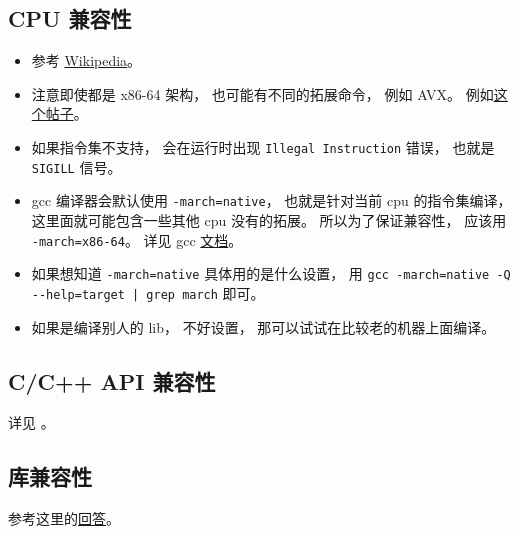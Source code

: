 
\begin{issues}
\issueDraft
\end{issues}


\subsection{CPU 兼容性}

\begin{itemize}
\item 参考 \href{https://en.wikipedia.org/wiki/Binary-code_compatibility}{Wikipedia}。
\item 注意即使都是 x86-64 架构， 也可能有不同的拓展命令， 例如 AVX。 例如\href{https://stackoverflow.com/questions/50945287/illegal-instruction-when-run-precompiled-program-on-other-machine}{这个帖子}。
\item 如果指令集不支持， 会在运行时出现 \verb`Illegal Instruction` 错误， 也就是 \verb`SIGILL` 信号。
\item gcc 编译器会默认使用 \verb`-march=native`， 也就是针对当前 cpu 的指令集编译， 这里面就可能包含一些其他 cpu 没有的拓展。 所以为了保证兼容性， 应该用 \verb`-march=x86-64`。 详见 gcc \href{https://gcc.gnu.org/onlinedocs/gcc/x86-Options.html}{文档}。
\item 如果想知道 \verb`-march=native` 具体用的是什么设置， 用 \verb`gcc -march=native -Q --help=target | grep march` 即可。
\item 如果是编译别人的 lib， 不好设置， 那可以试试在比较老的机器上面编译。
\end{itemize}

\subsection{C/C++ API 兼容性}
详见 。

\subsection{库兼容性}
参考这里的\href{https://stackoverflow.com/questions/20183883/determining-binary-compatibility-under-linux}{回答}。

